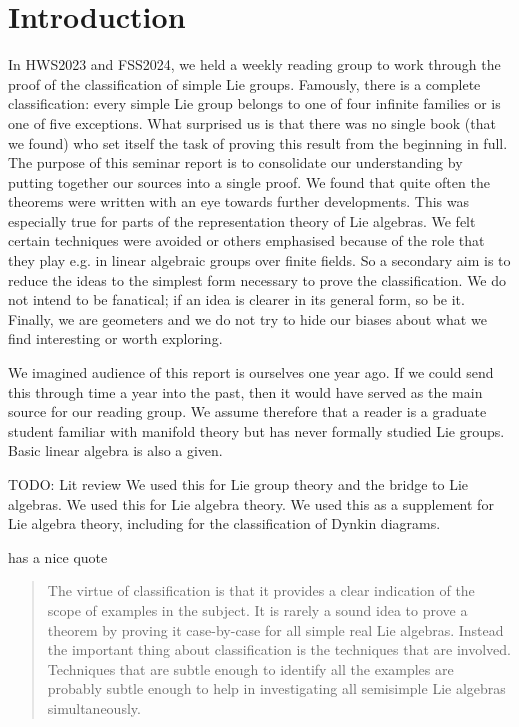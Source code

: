 
\section{Introduction}

In HWS2023 and FSS2024, we held a weekly reading group to work through the proof of the classification of simple Lie groups.
Famously, there is a complete classification: every simple Lie group belongs to one of four infinite families or is one of five exceptions.
What surprised us is that there was no single book (that we found) who set itself the task of proving this result from the beginning in full.
The purpose of this seminar report is to consolidate our understanding by putting together our sources into a single proof.
We found that quite often the theorems were written with an eye towards further developments.
This was especially true for parts of the representation theory of Lie algebras.
We felt certain techniques were avoided or others emphasised because of the role that they play e.g. in linear algebraic groups over finite fields.
So a secondary aim is to reduce the ideas to the simplest form necessary to prove the classification.
We do not intend to be fanatical; if an idea is clearer in its general form, so be it.
Finally, we are geometers and we do not try to hide our biases about what we find interesting or worth exploring.

We imagined audience of this report is ourselves one year ago.
If we could send this through time a year into the past, then it would have served as the main source for our reading group. 
We assume therefore that a reader is a graduate student familiar with manifold theory but has never formally studied Lie groups.
Basic linear algebra is also a given.

TODO: Lit review
\cite{Warner1983} We used this for Lie group theory and the bridge to Lie algebras.
\cite{Hall2015} We used this for Lie algebra theory.
\cite{Fulton2004} We used this as a supplement for Lie algebra theory, including for the classification of Dynkin diagrams.

\cite[p.~349]{Knapp1986} has a nice quote 
\begin{quotation}
The virtue of classification is that it provides a clear indication of
the scope of examples in the subject. It is rarely a sound idea to prove
a theorem by proving it case-by-case for all simple real Lie algebras.
Instead the important thing about classification is the techniques that are
involved. Techniques that are subtle enough to identify all the examples
are probably subtle enough to help in investigating all semisimple Lie
algebras simultaneously.
\end{quotation}

